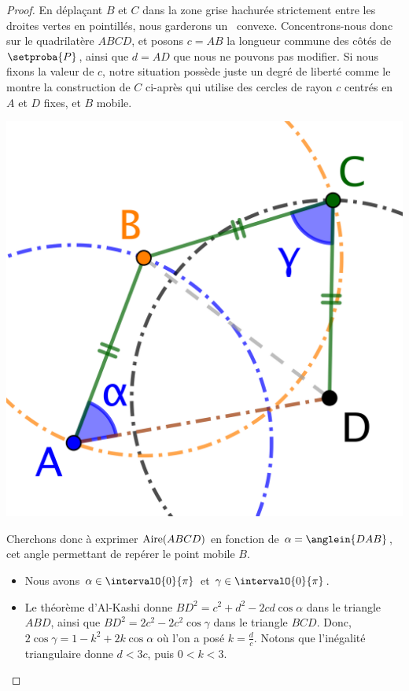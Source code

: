 \begin{proof}
	En déplaçant $B$ et $C$ dans la zone grise hachurée strictement entre les droites vertes en pointillés, nous garderons un \ngone\ convexe.
	Concentrons-nous donc sur le quadrilatère $ABCD$, et posons $c = AB$ la longueur commune des côtés de $\setproba{P}$, ainsi que $d = AD$ que nous ne pouvons pas modifier.
	Si nous fixons la valeur de $c$, notre situation possède juste un degré de liberté comme le montre la construction de $C$ ci-après qui utilise des cercles de rayon $c$ centrés en $A$ et $D$ fixes, et $B$ mobile.
	\begin{center}
		\includegraphics[scale=.4]{content/polygon/sol-must-be/2-eq-angles-circle.png}
	\end{center}

	Cherchons donc à exprimer $\mathrm{Aire}(ABCD)$ en fonction de $\alpha = \anglein{DAB}$, cet angle permettant de repérer le point mobile $B$.
	\begin{itemize}
	    \item Nous avons $\alpha \in \intervalO{0}{\pi}$ et $\gamma \in \intervalO{0}{\pi}$.


	    \item Le théorème d'Al-Kashi donne
	    $BD^2 = c^2 + d^2 - 2 c d \cos \alpha$ dans le triangle $ABD$,
	    ainsi que
	    $BD^2 = 2 c^2 - 2 c^2 \cos \gamma$ dans le triangle $BCD$.
	    Donc,
	    $2 \cos \gamma = 1 - k^2 + 2 k \cos \alpha$ où l'on a posé $k = \frac{d}{c}$.
	    Notons que l'inégalité triangulaire donne $d < 3 c$, puis $0 < k < 3$.



\end{itemize}
\end{proof}

